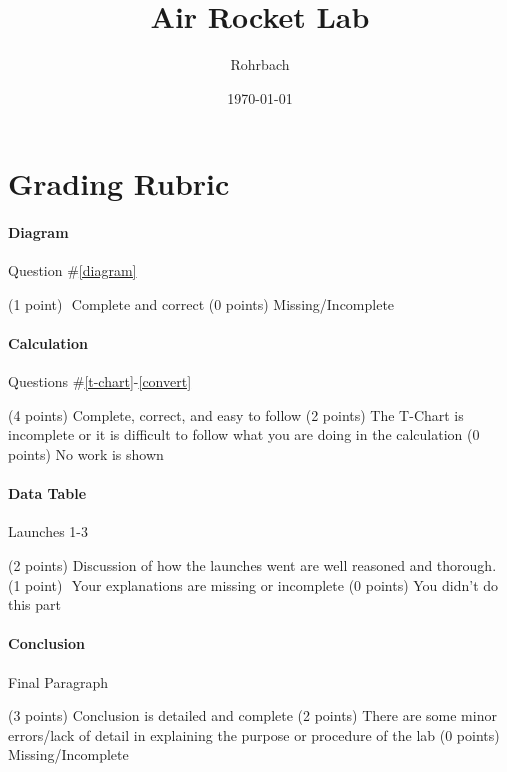 \documentclass[10pt]{exam}
\title{Air Rocket Lab}
\author{Rohrbach}
\date{\today}
\begin{document}
\maketitle


\section*{Grading Rubric}

  \paragraph{Diagram} Question \#\ref{diagram}
  \vspace{0.5em}
  \begin{checkboxes} \small
    \choice (1 point)\,\, Complete and correct 
    \choice (0 points) Missing/Incomplete
  \end{checkboxes}


  \paragraph{Calculation} Questions \#\ref{t-chart}-\ref{convert}
  \vspace{0.5em}
  \begin{checkboxes} \small
    \choice (4 points) Complete, correct, and easy to follow 
    \choice (2 points) The T-Chart is incomplete or it is difficult to follow what you are doing in the calculation
    \choice (0 points) No work is shown
  \end{checkboxes}


  \paragraph{Data Table} Launches 1-3
  \vspace{0.5em}
  \begin{checkboxes} \small
    \choice (2 points) Discussion of how the launches went are well reasoned and thorough.
    \choice (1 point)\,\, Your explanations are missing or incomplete
    \choice (0 points) You didn't do this part
  \end{checkboxes}

  \paragraph{Conclusion} Final Paragraph
  \vspace{0.5em}
  \begin{checkboxes} \small
    \choice (3 points) Conclusion is detailed and complete
    \choice (2 points) There are some minor errors/lack of detail in explaining the purpose or procedure of the lab
    \choice (0 points) Missing/Incomplete
  \end{checkboxes}
\end{document}
